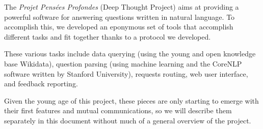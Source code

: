 The {\em Projet Pensées Profondes} (Deep Thought Project) aims at
providing a powerful software for answering questions written in
natural language.
To accomplish this, we developed an eponymous set of tools that
accomplish different tasks and fit together thanks to a protocol
we developed.

These various tasks include data querying (using the young and open
knowledge base Wikidata), question parsing (using machine learning and the
CoreNLP software written by Stanford University),
requests routing, web user interface, and feedback reporting.

Given the young age of this project, these pieces are only starting
to emerge with their first features and mutual communications,
so we will describe them separately in this document without
much of a general overview of the project.
